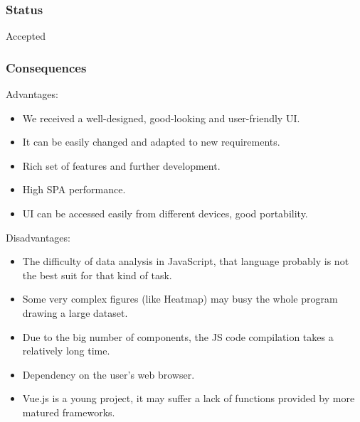 \subsubsection{Status}\label{status}

Accepted

\subsubsection{Consequences}\label{consequences}

Advantages:

\begin{itemize}
\tightlist
\item
  We received a well-designed, good-looking and user-friendly UI.
\item
  It can be easily changed and adapted to new requirements.
\item
  Rich set of features and further development.
\item
  High SPA performance.
\item
  UI can be accessed easily from different devices, good portability.
\end{itemize}

Disadvantages:

\begin{itemize}
\tightlist
\item
  The difficulty of data analysis in JavaScript, that language probably
  is not the best suit for that kind of task.
\item
  Some very complex figures (like Heatmap) may busy the whole program
  drawing a large dataset.
\item
  Due to the big number of components, the JS code compilation takes a
  relatively long time.
\item
  Dependency on the user's web browser.
\item
  Vue.js is a young project, it may suffer a lack of functions provided
  by more matured frameworks.
\end{itemize}

